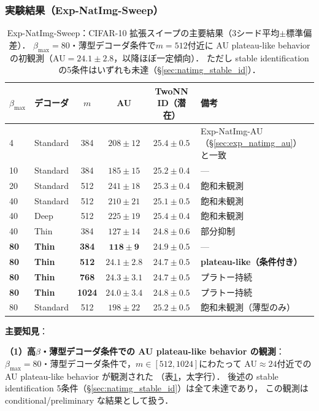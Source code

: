 \documentclass[11pt,a4paper]{jsarticle}
\begin{document}
\subsubsection*{実験結果（Exp-NatImg-Sweep）}

\begin{table}[H]
\centering
\caption{Exp-NatImg-Sweep：CIFAR-10 拡張スイープの主要結果（3シード平均$\pm$標準偏差）．
$\beta_{\max}=80$・薄型デコーダ条件で$m=512$付近に AU plateau-like behavior の初観測（AU$=24.1\pm2.8$，以降ほぼ一定傾向）．
ただし stable identification の5条件はいずれも未達（§\ref{sec:natimg_stable_id}）．}
\label{tab:natimg_sweep}
\small
\begin{tabular}{llcccl}
\toprule
$\beta_{\max}$ & デコーダ & $m$ & AU & TwoNN ID（潜在） & 備考 \\
\midrule
4  & Standard & 384 & $208\pm12$ & $25.4\pm0.5$ & Exp-NatImg-AU（§\ref{sec:exp_natimg_au}）と一致 \\
10 & Standard & 384 & $185\pm15$ & $25.2\pm0.4$ & --- \\
20 & Standard & 512 & $241\pm18$ & $25.3\pm0.4$ & 飽和未観測 \\
40 & Standard & 512 & $210\pm21$ & $25.1\pm0.5$ & 飽和未観測 \\
40 & Deep      & 512 & $225\pm19$ & $25.4\pm0.4$ & 飽和未観測 \\
40 & Thin      & 384 & $127\pm14$ & $24.8\pm0.6$ & 部分抑制 \\
\textbf{80} & \textbf{Thin} & \textbf{384} & $\boldsymbol{118\pm9}$ & $24.9\pm0.5$ & --- \\
\textbf{80} & \textbf{Thin} & \textbf{512} & $\boldsymbol{24.1\pm2.8}$ & $24.7\pm0.5$ & \textbf{plateau-like（条件付き）} \\
\textbf{80} & \textbf{Thin} & \textbf{768} & $\boldsymbol{24.3\pm3.1}$ & $24.7\pm0.5$ & プラトー持続 \\
\textbf{80} & \textbf{Thin} & \textbf{1024}& $\boldsymbol{24.0\pm3.4}$ & $24.8\pm0.5$ & プラトー持続 \\
80 & Standard  & 512 & $198\pm22$ & $25.2\pm0.5$ & 飽和未観測（薄型のみ） \\
\bottomrule
\end{tabular}
\end{table}

\textbf{主要知見}：

\textbf{（1）高$\beta$・薄型デコーダ条件での AU plateau-like behavior の観測}：
$\beta_{\max}=80$・薄型デコーダ条件で，$m \in [512, 1024]$にわたって
AU$\approx 24$付近での AU plateau-like behavior が観測された
（表\ref{tab:natimg_sweep}，太字行）．
後述の stable identification 5条件（§\ref{sec:natimg_stable_id}）は全て未達であり，
この観測は conditional/preliminary な結果として扱う．
\end{document}
